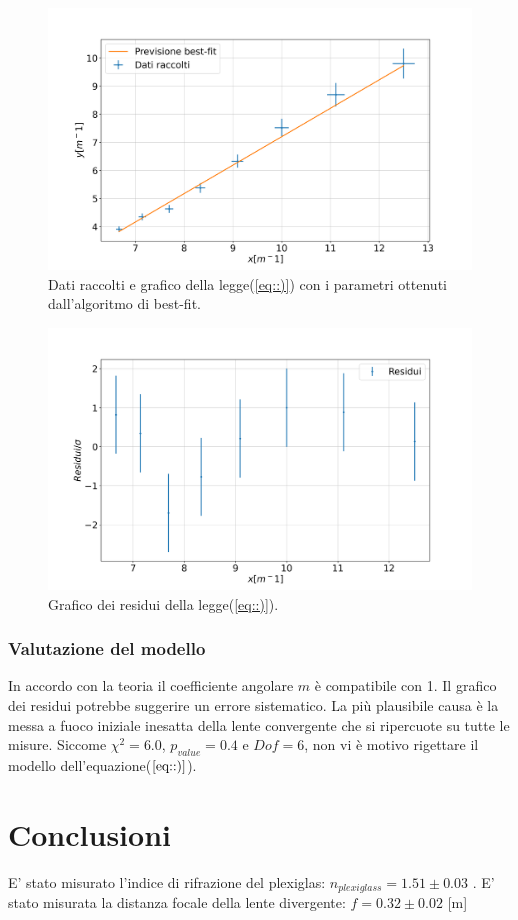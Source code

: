 \documentclass{article}
\begin{document}
\begin{figure}[H]
	\includegraphics[width=\textwidth]{Dati_raccoltilen.png}
	\caption{Dati raccolti e grafico della legge(\ref{eq::)}) con i parametri ottenuti dall'algoritmo di best-fit.}
	\label{fig:len}
\end{figure}

\begin{figure}[H]
	\includegraphics[width=\textwidth]{Dati_raccolti_residuilen.png}
	\caption{Grafico dei residui della legge(\ref{eq::)}).}
	\label{fig:lenres}
\end{figure}

\subsubsection{Valutazione del modello}

In accordo con la teoria il coefficiente angolare $m$ è compatibile con 1.
Il grafico dei residui potrebbe suggerire un errore sistematico. La più plausibile causa è la messa a fuoco iniziale inesatta della lente convergente che si ripercuote su tutte le misure.
Siccome $\chi^2= 6.0$, $p_{value}= 0.4$  e $Dof= 6$,  non vi è motivo rigettare il modello dell'equazione($\ref{eq::)}$).


\section{Conclusioni}

E' stato misurato l'indice di rifrazione del plexiglas: $n_{plexiglass}= 1.51 \pm 0.03$ .
E' stato misurata la distanza focale della lente divergente: $f=0.32\pm0.02$ [m]
\end{document}
